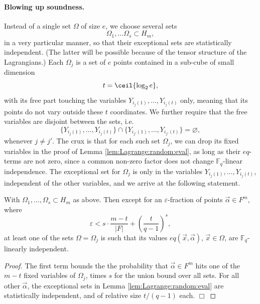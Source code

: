 \paragraph{Blowing up soundness.}
Instead of a single set $\Omega$ of size $e$, we choose several sets
\[
\Omega_1, \ldots \Omega_s \subset H_m,
\]
in a very particular manner, so that their exceptional sets are statistically independent.
(The latter will be possible because of the tensor structure of the Lagrangians.)
Each $\Omega_j$ is a set of $e$ points contained in a sub-cube of small dimension 
\[
t = \ceil{\log_2 e},
\]
with its free part touching the variables $Y_{i_j(1)}, \ldots, Y_{i_j(t)}$ only, meaning that its points do not vary outside these $t$ coordinates.  
We further require that the free variables are disjoint between the sets, i.e.
\[
\big\{Y_{i_j(1)},\ldots, Y_{i_j(t)} \big\} \cap \big\{Y_{i_{j'}(1)},\ldots, Y_{i_{j'}(t)} \big\} = \varnothing,
\]
whenever $j\neq j'$.
The crux is that for each such set $\Omega_j$, we can drop its fixed variables in the proof of Lemma \ref{lem:Lagrange:random:eval}, as long as their $eq$-terms are not zero, since a common non-zero factor does not change $\mathbb F_q$-linear independence. 
The exceptional set for $\Omega_j$ is only in the variables $Y_{i_j(1)}, \ldots, Y_{i_j(t)}$, independent of the other variables, and we arrive at the following statement.

\begin{lem}
\label{lem:zk:basefield:randomization}
With $\Omega_1,\ldots, \Omega_s \subset H_{m}$ as above.
Then except for an $\varepsilon$-fraction of points $\vec\alpha\in F^m$, where
\begin{equation}
\label{e:basefield:randomization:error}
\varepsilon < s\cdot \frac{m-t}{|F|} + \left(\frac{t}{q-1}\right)^s,
\end{equation}
at least one of the sets $\Omega = \Omega_j$ is such that its values $eq(\vec x, \vec\alpha)$, $\vec x\in \Omega$, are $\mathbb F_q$-linearly independent.
\end{lem}
\begin{proof}
The first term bounds the the probability that $\vec\alpha\in F^m$ hits one of the $m-t$ fixed variables of $\Omega_j$, times $s$ for the union bound over all sets.
For all other $\vec\alpha$, the exceptional sets in Lemma \ref{lem:Lagrange:random:eval} are statistically independent, and of relative size $t/(q-1)$ each.
$\Box$
\end{proof}

